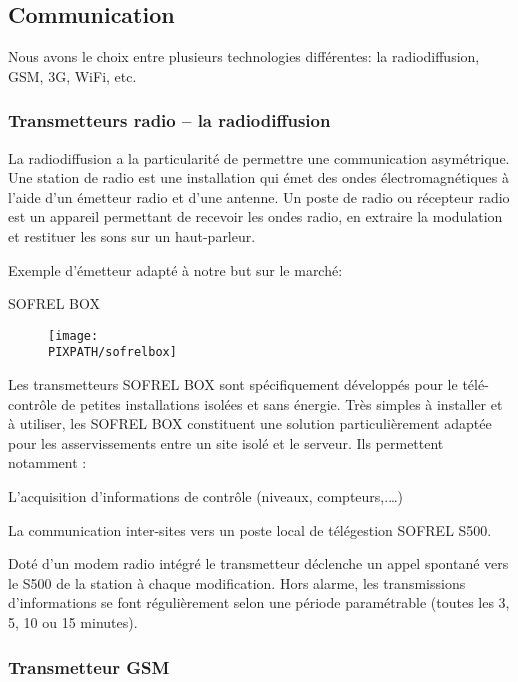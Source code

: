 \subsection{Communication}

Nous avons le choix entre plusieurs technologies différentes: la radiodiffusion, GSM, 3G, WiFi, etc.

\subsubsection{Transmetteurs radio – la radiodiffusion}

La radiodiffusion a la particularité de permettre une communication asymétrique. 
Une station de radio est une installation qui émet des ondes électromagnétiques à l'aide d'un émetteur radio et d'une antenne. 
Un poste de radio ou récepteur radio est un appareil permettant de recevoir les ondes radio, en extraire la modulation et restituer les sons sur un haut-parleur. 

Exemple d'émetteur adapté à notre but sur le marché: 

SOFREL BOX
    \begin{figure}[!h]
    \begin{center}
    \texttt{[image: \\PIXPATH/sofrelbox]}
    \caption{}
    \end{center}
    \end{figure}
Les transmetteurs SOFREL BOX sont spécifiquement développés pour le télé-contrôle de petites installations isolées et sans énergie.
Très simples à installer et à utiliser, les SOFREL BOX constituent une solution particulièrement adaptée pour les asservissements entre un site isolé et le serveur.
Ils permettent notamment :
\begin{description}
\item L’acquisition d’informations de contrôle (niveaux, compteurs,.…)
\item La communication inter-sites vers un poste local de télégestion SOFREL S500.
\end{description}
Doté d’un modem radio intégré le transmetteur déclenche un appel spontané vers le S500 de la station à chaque modification.
Hors alarme, les transmissions d’informations se font régulièrement selon une période paramétrable (toutes les 3, 5, 10 ou 15 minutes).

\subsubsection{Transmetteur GSM}

